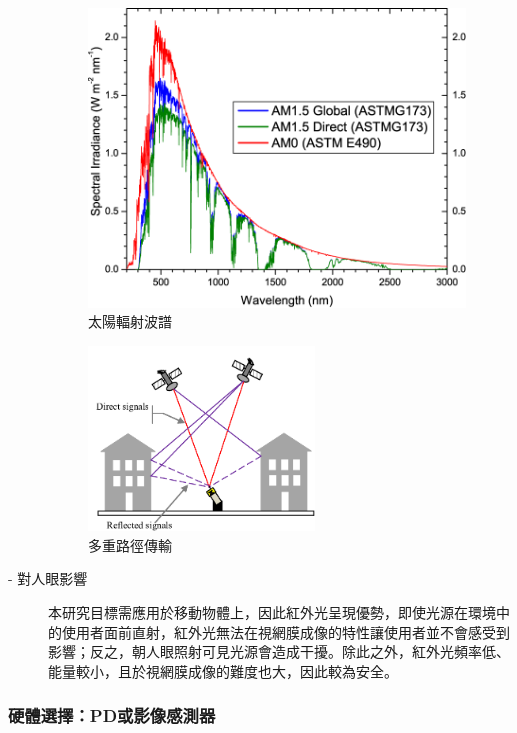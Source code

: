 \begin{description}
        \begin{figure}[ht]
            \centering
            \includegraphics[width=10cm]{ch2pic/solar_spectra.png}
            \caption{太陽輻射波譜\cite{astm}}
            \label{pic:solar_spectrum}
        \end{figure}

        

        \begin{figure}[ht]
            \centering
            \includegraphics[width=6cm]{ch2pic/multipath.png}
            \caption{多重路徑傳輸\cite{pic:multipath}}
            \label{pic:multipath}
        \end{figure}

        \item[- 對人眼影響]\hfill 

        本研究目標需應用於移動物體上，因此紅外光呈現優勢，即使光源在環境中的使用者面前直射，紅外光無法在視網膜成像的特性讓使用者並不會感受到影響；反之，朝人眼照射可見光源會造成干擾。除此之外，紅外光頻率低、能量較小，且於視網膜成像的難度也大，因此較為安全。

        \end{description}


        

        \subsubsection{硬體選擇：PD或影像感測器}

